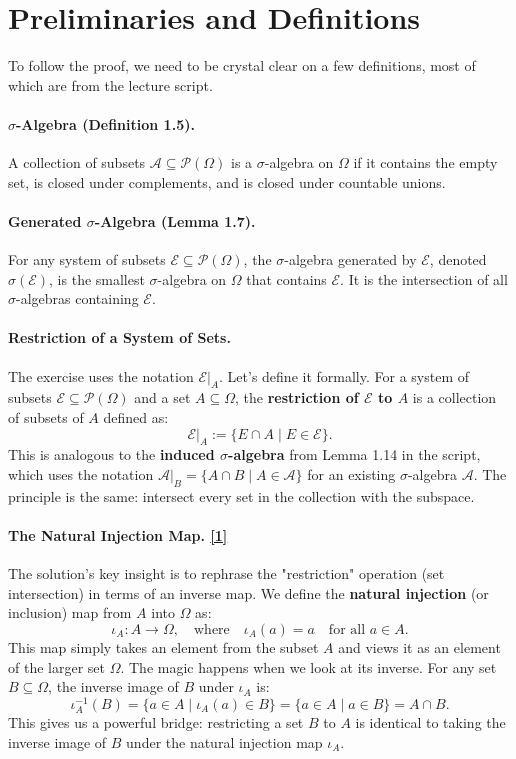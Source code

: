 \documentclass[11pt,a4paper]{article}
\begin{document}
\section{Preliminaries and Definitions}

To follow the proof, we need to be crystal clear on a few definitions, most of which are from the lecture script.

\paragraph{$\sigma$-Algebra (Definition 1.5).} A collection of subsets $\mathcal{A} \subseteq \mathcal{P}(\Omega)$ is a $\sigma$-algebra on $\Omega$ if it contains the empty set, is closed under complements, and is closed under countable unions.

\paragraph{Generated $\sigma$-Algebra (Lemma 1.7).} For any system of subsets $\mathcal{E} \subseteq \mathcal{P}(\Omega)$, the $\sigma$-algebra generated by $\mathcal{E}$, denoted $\sigma(\mathcal{E})$, is the smallest $\sigma$-algebra on $\Omega$ that contains $\mathcal{E}$. It is the intersection of all $\sigma$-algebras containing $\mathcal{E}$.

\paragraph{Restriction of a System of Sets.} The exercise uses the notation $\mathcal{E}|_A$. Let's define it formally. For a system of subsets $\mathcal{E} \subseteq \mathcal{P}(\Omega)$ and a set $A \subseteq \Omega$, the \textbf{restriction of $\mathcal{E}$ to $A$} is a collection of subsets of $A$ defined as:
\[
    \mathcal{E}|_A := \{E \cap A \mid E \in \mathcal{E}\}.
\]
This is analogous to the \textbf{induced $\sigma$-algebra} from Lemma 1.14 in the script, which uses the notation $\mathcal{A}|_B = \{A \cap B \mid A \in \mathcal{A}\}$ for an existing $\sigma$-algebra $\mathcal{A}$. The principle is the same: intersect every set in the collection with the subspace.
\hypertarget{note3}{}

\paragraph{The Natural Injection Map. \hyperlink{exp3}{[1]}} The solution's key insight is to rephrase the "restriction" operation (set intersection) in terms of an inverse map. We define the \textbf{natural injection} (or inclusion) map from $A$ into $\Omega$ as:
\[
    \iota_A: A \to \Omega, \quad \text{where} \quad \iota_A(a) = a \quad \text{for all } a \in A.
\]
This map simply takes an element from the subset $A$ and views it as an element of the larger set $\Omega$. The magic happens when we look at its inverse. For any set $B \subseteq \Omega$, the inverse image of $B$ under $\iota_A$ is:
\[
    \iota_A^{-1}(B) = \{a \in A \mid \iota_A(a) \in B\} = \{a \in A \mid a \in B\} = A \cap B.
\]
This gives us a powerful bridge: restricting a set $B$ to $A$ is identical to taking the inverse image of $B$ under the natural injection map $\iota_A$.
\end{document}
